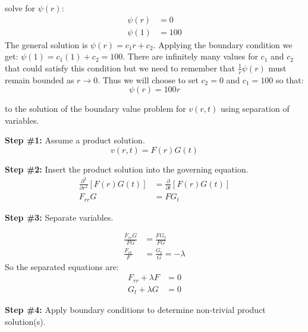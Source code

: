  solve for $\psi(r)$:
\begin{align*}
\psi(r) &= 0 \\
\psi(1) &= 100
\end{align*}
The general solution is $\psi(r) = c_1r + c_2$.  Applying the boundary condition we get: $\psi(1) = c_1(1) + c_2 = 100$. There are infinitely many values for $c_1$ and $c_2$ that could satisfy this condition but we need to remember that $\frac{1}{r}\psi(r)$ must remain bounded as $r \to 0$.  Thus we will choose to set $c_2 = 0$ and $c_1 = 100$ so that:
\begin{equation}
\psi(r) = 100r
\label{eq:lec35-psi-sol}
\end{equation}

 to the solution of the boundary value problem for $v(r,t)$ using separation of variables.

\vspace{0.25cm}

\noindent\textbf{Step \#1:} Assume a product solution.
\begin{equation*}
v(r,t) = F(r)G(t)
\end{equation*}

\vspace{0.25cm}

\noindent\textbf{Step \#2:} Insert the product solution into the governing equation.
\begin{align*}
\frac{\partial^2}{\partial r^2}\left[F(r)G(t)\right] &= \frac{\partial}{\partial t}\left[F(r)G(t)\right] \\
F_{rr}G &= FG_t
\end{align*}


\vspace{0.25cm}

\noindent\textbf{Step \#3:} Separate variables.

\begin{align*}
\frac{F_{rr}G}{FG} &= \frac{FG_t}{FG} \\
\frac{F_{rr}}{F} &= \frac{G_t}{G} = -\lambda
\end{align*}
So the separated equations are:
\begin{align*}
F_{rr} + \lambda F&= 0 \\
G_{t} + \lambda G &= 0
\end{align*}

\vspace{0.25cm}

\noindent\textbf{Step \#4:} Apply boundary conditions to determine non-trivial product solution(s).

